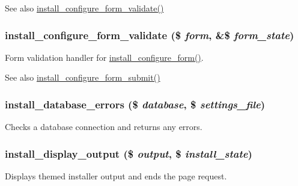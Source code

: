 \begin{DoxySeeAlso}{See also}
\hyperlink{install_8core_8inc_a6b3794048999c91eed0b6a7633a8e8f3}{install\_\-configure\_\-form\_\-validate()} 
\end{DoxySeeAlso}
\hypertarget{install_8core_8inc_a6b3794048999c91eed0b6a7633a8e8f3}{
\subsubsection[{install\_\-configure\_\-form\_\-validate}]{\setlength{\rightskip}{0pt plus 5cm}install\_\-configure\_\-form\_\-validate (\$ {\em form}, \/  \&\$ {\em form\_\-state})}}
\label{install_8core_8inc_a6b3794048999c91eed0b6a7633a8e8f3}
Form validation handler for \hyperlink{group__forms_ga38e5d79d667dbc48f40ca4238d6d161b}{install\_\-configure\_\-form()}.

\begin{DoxySeeAlso}{See also}
\hyperlink{install_8core_8inc_ac4774b453669916d9ffbb619b4bf9717}{install\_\-configure\_\-form\_\-submit()} 
\end{DoxySeeAlso}
\hypertarget{install_8core_8inc_a695213046db5d896caef10f82da54b87}{
\subsubsection[{install\_\-database\_\-errors}]{\setlength{\rightskip}{0pt plus 5cm}install\_\-database\_\-errors (\$ {\em database}, \/  \$ {\em settings\_\-file})}}
\label{install_8core_8inc_a695213046db5d896caef10f82da54b87}
Checks a database connection and returns any errors. \hypertarget{install_8core_8inc_aadf48482ac0487e79f48b346dc550806}{
\subsubsection[{install\_\-display\_\-output}]{\setlength{\rightskip}{0pt plus 5cm}install\_\-display\_\-output (\$ {\em output}, \/  \$ {\em install\_\-state})}}
\label{install_8core_8inc_aadf48482ac0487e79f48b346dc550806}
Displays themed installer output and ends the page request.

